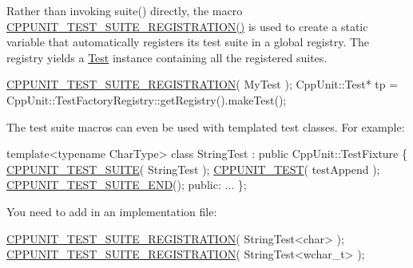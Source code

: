 Rather than invoking suite() directly, the macro \hyperlink{group___creating_test_suite_ga2f4071eec88d1e306665ada0f2dd80e4}{C\+P\+P\+U\+N\+I\+T\+\_\+\+T\+E\+S\+T\+\_\+\+S\+U\+I\+T\+E\+\_\+\+R\+E\+G\+I\+S\+T\+R\+A\+T\+I\+O\+N()} is used to create a static variable that automatically registers its test suite in a global registry. The registry yields a \hyperlink{class_test}{Test} instance containing all the registered suites. 
\begin{DoxyCode}
\hyperlink{group___creating_test_suite_ga2f4071eec88d1e306665ada0f2dd80e4}{CPPUNIT\_TEST\_SUITE\_REGISTRATION}( MyTest );
CppUnit::Test* tp =
  CppUnit::TestFactoryRegistry::getRegistry().makeTest();
\end{DoxyCode}


The test suite macros can even be used with templated test classes. For example\+:


\begin{DoxyCode}
\textcolor{keyword}{template}<\textcolor{keyword}{typename} CharType>
\textcolor{keyword}{class }StringTest : \textcolor{keyword}{public} CppUnit::TestFixture \{
  \hyperlink{group___writing_test_fixture_gabe1e12200f40d6f25d60c1783c99da81}{CPPUNIT\_TEST\_SUITE}( StringTest );
  \hyperlink{group___writing_test_fixture_gaac9b03d898b207e1daf2f93867935a96}{CPPUNIT\_TEST}( testAppend );
  \hyperlink{group___writing_test_fixture_ga601b2e1d525f3947b216e28c625abcb1}{CPPUNIT\_TEST\_SUITE\_END}();
\textcolor{keyword}{public}:  
  ...
\};
\end{DoxyCode}


You need to add in an implementation file\+:


\begin{DoxyCode}
\hyperlink{group___creating_test_suite_ga2f4071eec88d1e306665ada0f2dd80e4}{CPPUNIT\_TEST\_SUITE\_REGISTRATION}( StringTest<char> );
\hyperlink{group___creating_test_suite_ga2f4071eec88d1e306665ada0f2dd80e4}{CPPUNIT\_TEST\_SUITE\_REGISTRATION}( StringTest<wchar\_t> );
\end{DoxyCode}
 